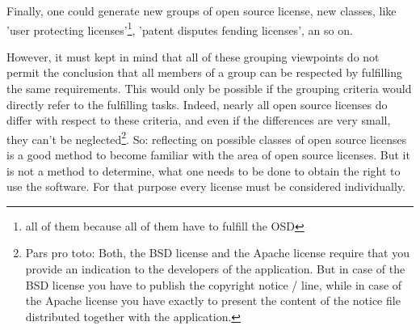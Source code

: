 Finally, one could generate new groups of open source license, new classes, like
'user protecting licenses'\footnote{all of them because all of them have to
fulfill the OSD}, 'patent disputes fending licenses', an so on.

However, it must kept in mind that all of these grouping viewpoints do not
permit the conclusion that all members of a group can be respected by fulfilling
the same requirements. This would only be possible if the grouping criteria
would directly refer to the fulfilling tasks. Indeed, nearly all open source
licenses do differ with respect to these criteria, and even if the differences
are very small, they can't be neglected\footnote{Pars pro toto: Both, the BSD
license and the Apache license require that you provide an indication to the
developers of the application. But in case of the BSD license you have to
publish the copyright notice / line, while in case of the Apache license you
have exactly to present the content of the notice file distributed together with
the application.}. So: reflecting on possible classes of open source licenses is
a good method to become familiar with the area of open source licenses. But it
is not a method to determine, what one needs to be done to obtain the right to
use the software. For that purpose every license must be considered
individually.



%
